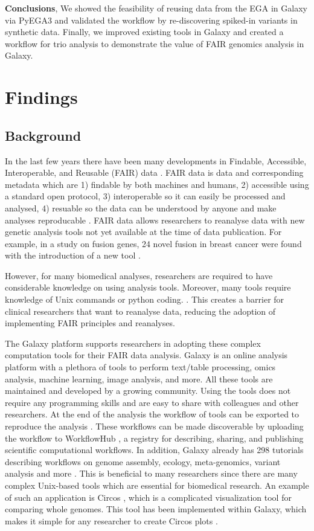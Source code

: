 \textbf{Conclusions},
We showed the feasibility of reusing data from the EGA in Galaxy via PyEGA3 and validated the workflow by re-discovering spiked-in variants in synthetic data. Finally, we improved existing tools in Galaxy and created a workflow for trio analysis to demonstrate the value of FAIR genomics analysis in Galaxy.

\section*{Findings}
\label{sec:finding}

\subsection*{Background}
In the last few years there have been many developments in Findable, Accessible, Interoperable, and Reusable (FAIR) data \cite{Inau2021}. FAIR data is data and corresponding metadata which are 1) findable by both machines and humans, 2) accessible using a standard open protocol, 3) interoperable so it can easily be processed and analysed, 4) resuable so the data can be understood by anyone and make analyses reproducable \cite{fair}. FAIR data allows researchers to reanalyse data with new genetic analysis tools not yet available at the time of data publication. For example, in a study on fusion genes, 24 novel fusion in breast cancer were found with the introduction of a new tool \cite{FusionCatcher}. 

However, for many biomedical analyses, researchers are required to have considerable knowledge on using analysis tools. Moreover, many tools require knowledge of Unix commands or python coding. \cite{SnpEff, samtools, circos}. This creates a barrier for clinical researchers that want to reanalyse data, reducing the adoption of implementing FAIR principles and reanalyses.

The Galaxy platform \cite{galaxy} supports researchers in adopting these complex computation tools for their FAIR data analysis. Galaxy is an online analysis platform with a plethora of tools to perform text/table processing, omics analysis, machine learning, image analysis, and more. All these tools are maintained and developed by a growing community. Using the tools does not require any programming skills and are easy to share with colleagues and other researchers. At the end of the analysis the workflow of tools can be exported to reproduce the analysis \cite{galaxy}. These workflows can be made discoverable by uploading the workflow to WorkflowHub \cite{workflowhub}, a registry for describing, sharing, and publishing scientific computational workflows. In addition, Galaxy already has 298 tutorials describing workflows on genome assembly, ecology, meta-genomics, variant analysis and more \cite{GTNstats}. This is beneficial to many researchers since there are many complex Unix-based tools which are essential for biomedical research. An example of such an application is Circos \cite{circos}, which is a complicated visualization tool for comparing whole genomes. This tool has been implemented within Galaxy, which makes it simple for any researcher to create Circos plots \cite{galactic-circos}.

